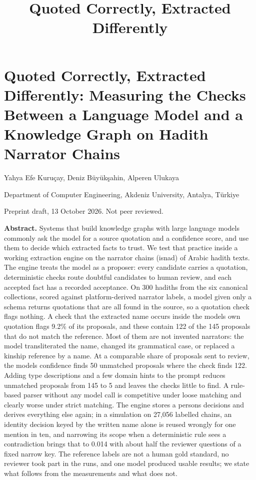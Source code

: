 \documentclass[
  english,
]{article}
\title{Quoted Correctly, Extracted Differently}
\author{}
\date{}
\begin{document}
\maketitle

\section{Quoted Correctly, Extracted Differently: Measuring the Checks
Between a Language Model and a Knowledge Graph on Hadith Narrator
Chains}\label{quoted-correctly-extracted-differently-measuring-the-checks-between-a-language-model-and-a-knowledge-graph-on-hadith-narrator-chains}

Yahya Efe Kuruçay, Deniz Büyükşahin, Alperen Ulukaya

Department of Computer Engineering, Akdeniz University, Antalya, Türkiye

Preprint draft, 13 October 2026. Not peer reviewed.

\textbf{Abstract.} Systems that build knowledge graphs with large
language models commonly ask the model for a source quotation and a
confidence score, and use them to decide which extracted facts to trust.
We test that practice inside a working extraction engine on the narrator
chains (isnad) of Arabic hadith texts. The engine treats the model as a
proposer: every candidate carries a quotation, deterministic checks
route doubtful candidates to human review, and each accepted fact has a
recorded acceptance. On 300 hadiths from the six canonical collections,
scored against platform-derived narrator labels, a model given only a
schema returns quotations that are all found in the source, so a
quotation check flags nothing. A check that the extracted name occurs
inside the model\textquotesingle s own quotation flags 9.2\% of its
proposals, and these contain 122 of the 145 proposals that do not match
the reference. Most of them are not invented narrators: the model
transliterated the name, changed its grammatical case, or replaced a
kinship reference by a name. At a comparable share of proposals sent to
review, the model\textquotesingle s confidence finds 50 unmatched
proposals where the check finds 122. Adding type descriptions and a few
domain hints to the prompt reduces unmatched proposals from 145 to 5 and
leaves the checks little to find. A rule-based parser without any model
call is competitive under loose matching and clearly worse under strict
matching. The engine stores a person\textquotesingle s decisions and
derives everything else again; in a simulation on 27,056 labelled
chains, an identity decision keyed by the written name alone is reused
wrongly for one mention in ten, and narrowing its scope when a
deterministic rule sees a contradiction brings that to 0.014 with about
half the reviewer questions of a fixed narrow key. The reference labels
are not a human gold standard, no reviewer took part in the runs, and
one model produced usable results; we state what follows from the
measurements and what does not.
\end{document}
